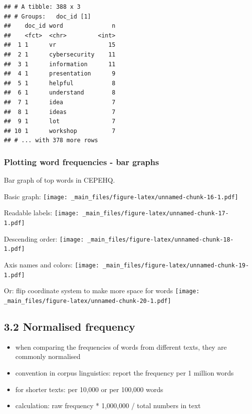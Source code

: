 \documentclass[a4paper, nobind]{templates/ociamthesis}
\providecommand{\tightlist}{%
  \setlength{\itemsep}{0pt}\setlength{\parskip}{0pt}}
\begin{document}
\begin{verbatim}
## # A tibble: 388 x 3
## # Groups:   doc_id [1]
##    doc_id word              n
##    <fct>  <chr>         <int>
##  1 1      vr               15
##  2 1      cybersecurity    11
##  3 1      information      11
##  4 1      presentation      9
##  5 1      helpful           8
##  6 1      understand        8
##  7 1      idea              7
##  8 1      ideas             7
##  9 1      lot               7
## 10 1      workshop          7
## # ... with 378 more rows
\end{verbatim}

\hypertarget{plotting-word-frequencies---bar-graphs}{%
\subsubsection{Plotting word frequencies - bar graphs}\label{plotting-word-frequencies---bar-graphs}}

Bar graph of top words in CEPEHQ.

Basic graph:
\texttt{[image: \_main\_files/figure-latex/unnamed-chunk-16-1.pdf]}

Readable labels:
\texttt{[image: \_main\_files/figure-latex/unnamed-chunk-17-1.pdf]}

Descending order:
\texttt{[image: \_main\_files/figure-latex/unnamed-chunk-18-1.pdf]}

Axis names and colors:
\texttt{[image: \_main\_files/figure-latex/unnamed-chunk-19-1.pdf]}

Or: flip coordinate system to make more space for words
\texttt{[image: \_main\_files/figure-latex/unnamed-chunk-20-1.pdf]}

\hypertarget{normalised-frequency}{%
\subsection{3.2 Normalised frequency}\label{normalised-frequency}}

\begin{itemize}
\tightlist
\item
  when comparing the frequencies of words from different texts, they are commonly normalised
\item
  convention in corpus linguistics: report the frequency per 1 million words
\item
  for shorter texts: per 10,000 or per 100,000 words
\item
  calculation: raw frequency * 1,000,000 / total numbers in text
\end{itemize}
\end{document}

